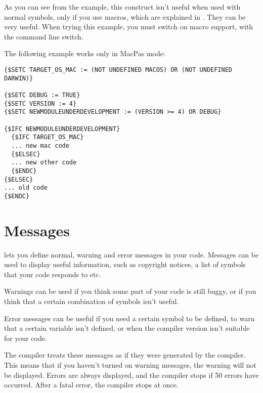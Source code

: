 As you can see from the example, this construct isn't useful when used
with normal symbols, only if you use macros, which are explained in
. They can be very useful. When trying this example, you must
switch on macro support, with the  command line switch.

The following example works only in MacPas mode:
\begin{verbatim}
{$SETC TARGET_OS_MAC := (NOT UNDEFINED MACOS) OR (NOT UNDEFINED DARWIN)}

{$SETC DEBUG := TRUE}
{$SETC VERSION := 4}
{$SETC NEWMODULEUNDERDEVELOPMENT := (VERSION >= 4) OR DEBUG}

{$IFC NEWMODULEUNDERDEVELOPMENT}
  {$IFC TARGET_OS_MAC}
  ... new mac code
  {$ELSEC}
  ... new other code
  {$ENDC}
{$ELSEC}
... old code
{$ENDC}
\end{verbatim}

\section{Messages}
\label{se:Messages}
\fpc lets you define normal, warning and error messages in your code.
Messages can be used to display useful information, such as copyright
notices, a list of symbols that your code responds to etc.

Warnings can be used if you think some part of your code is still buggy, or
if you think that a certain combination of symbols isn't useful.

Error messages can be useful if you need a certain symbol to be defined,
to warn that a certain variable isn't defined, or when the compiler
version isn't suitable for your code.

The compiler treats these messages as if they were generated by the
compiler. This means that if you haven't turned on warning messages, the
warning will not be displayed. Errors are always displayed, and the
compiler stops if 50 errors have occurred. After a fatal error, the compiler
stops at once.

